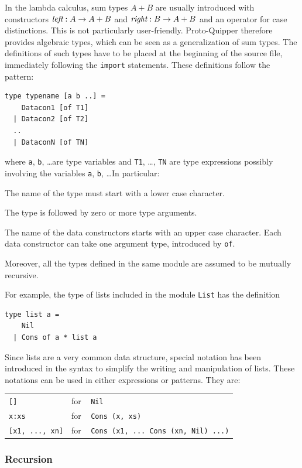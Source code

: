 In the lambda calculus, sum types $A+B$ are usually introduced with
constructors $\textit{left} : A\to A+B$ and $\textit{right} : B\to A+B$ and an
operator for case distinctions. This is not particularly
user-friendly. Proto-Quipper therefore provides algebraic types, which
can be seen as a generalization of sum types. The definitions of such
types have to be placed at the beginning of the source file,
immediately following the \verb#import# statements. These definitions
follow the pattern:
\begin{verbatim}
type typename [a b ..] =
    Datacon1 [of T1]
  | Datacon2 [of T2]
  ..
  | DataconN [of TN]
\end{verbatim}
where \verb#a#, \verb#b#, \ldots are type variables and \verb#T1#, \ldots, 
\verb#TN# are type expressions possibly involving the variables \verb#a#, 
\verb#b#, \ldots In particular:
\begin{compactitemize}
  \item The name of the type must start with a lower case character.
  \item The type is followed by zero or more type arguments.
  \item The name of the data constructors starts with an upper case
  character. Each data constructor can take one argument type, introduced 
  by \verb#of#.
  \item Moreover, all the types defined in the same module are assumed
  to be mutually recursive.
\end{compactitemize}
For example, the type of lists included in the module \verb#List# has the 
definition
\begin{verbatim}
type list a =
    Nil
  | Cons of a * list a
\end{verbatim}
Since lists are a very common data structure, special notation has been introduced in the syntax to simplify the writing and manipulation of lists. 
These notations can be used in either expressions or patterns. They are:
\begin{center}
\begin{tabular}{ll}
  \verb#[]#               & for ~ \verb#Nil# \\
  \verb#x:xs#             & for ~ \verb#Cons (x, xs)# \\
  \verb#[x1, ..., xn]# & for ~ 
                            \verb#Cons (x1, ... Cons (xn, Nil) ...)#
\end{tabular}
\end{center}

\subsubsection{Recursion}

